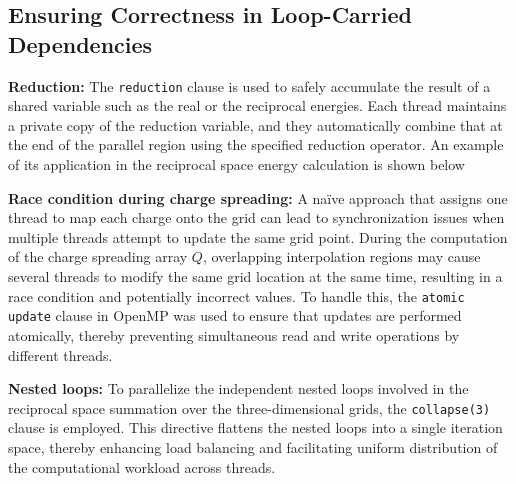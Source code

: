 \subsection{Ensuring Correctness in Loop-Carried Dependencies}
\textbf{Reduction:} The \verb|reduction| clause is used to safely accumulate the result of a shared variable such as the real or the reciprocal energies. Each thread maintains a private copy of the reduction variable, and they automatically combine that at the end of the parallel region using the specified reduction operator. An example of its application in the reciprocal space energy calculation is shown below


\textbf{Race condition during charge spreading:} A naïve approach that assigns one thread to map each charge onto the grid can lead to synchronization issues when multiple threads attempt to update the same grid point. During the computation of the charge spreading array $Q$, overlapping interpolation regions may cause several threads to modify the same grid location at the same time, resulting in a race condition and potentially incorrect values. To handle this, the \verb|atomic update| clause in OpenMP was used to ensure that updates are performed atomically, thereby preventing simultaneous read and write operations by different threads.


\textbf{Nested loops:} To parallelize the independent nested loops involved in the reciprocal space summation over the three-dimensional grids, the \texttt{collapse(3)} clause is employed. This directive flattens the nested loops into a single iteration space, thereby enhancing load balancing and facilitating uniform distribution of the computational workload across threads.


